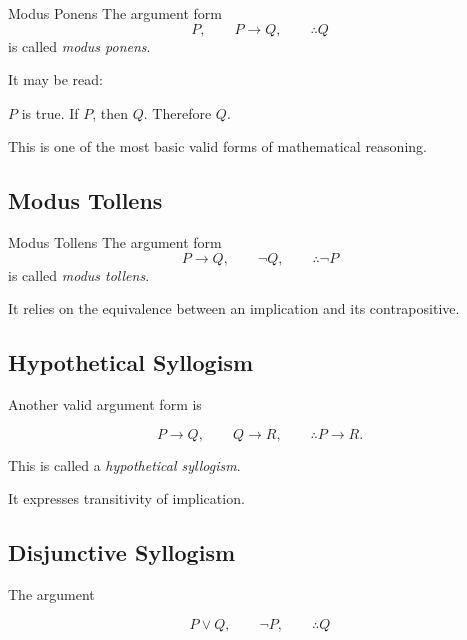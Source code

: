 \begin{definitionbox}{Modus Ponens}
The argument form
\[ P,\qquad P\to Q,\qquad \therefore Q \]
is called \emph{modus ponens}.
\end{definitionbox}

It may be read:

\begin{center}
\(P\) is true. If \(P\), then \(Q\). Therefore \(Q\).
\end{center}

This is one of the most basic valid forms of mathematical reasoning.

\subsection{Modus Tollens}
\label{subsec:modus-tollens}

\begin{definitionbox}{Modus Tollens}
The argument form
\[ P\to Q,\qquad \neg Q,\qquad \therefore\neg P \]
is called \emph{modus tollens}.
\end{definitionbox}

It relies on the equivalence between an implication and its contrapositive.

\subsection{Hypothetical Syllogism}
\label{subsec:hypothetical-syllogism}

Another valid argument form is

\[ P\to Q,\qquad Q\to R,\qquad \therefore P\to R. \]

This is called a \emph{hypothetical syllogism}.

It expresses transitivity of implication.

\subsection{Disjunctive Syllogism}
\label{subsec:disjunctive-syllogism}

The argument

\[ P\lor Q,\qquad \neg P,\qquad \therefore Q \]

